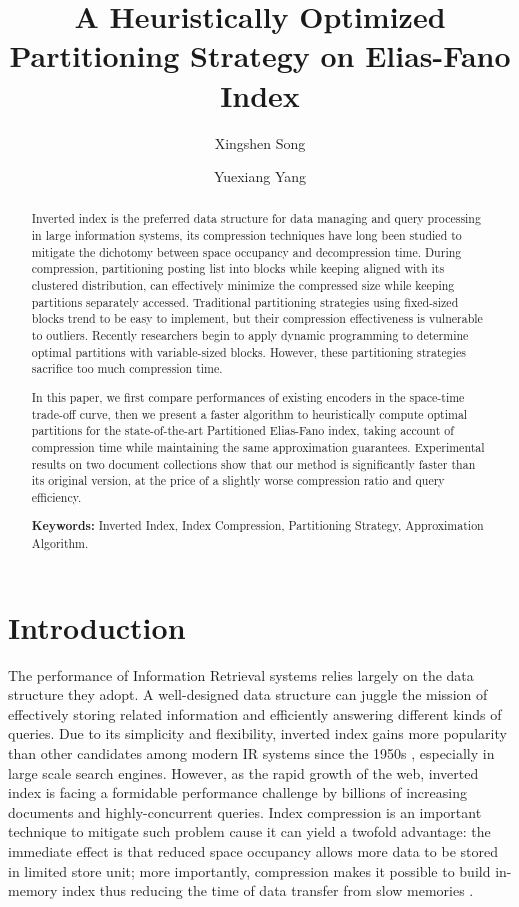\documentclass[runningheads]{comsis2}
\title{A Heuristically Optimized Partitioning Strategy on Elias-Fano Index}
\author{Xingshen Song \and Yuexiang Yang}
\institute{College of Computer, National University of Defense Technology\\ Changsha, China\\
  \email{\{songxingshen, yyx\}@nudt.edu.cn}}
\begin{document}
\maketitle

\begin{abstract}
Inverted index is the preferred data structure for data managing and query processing in large information systems, its compression techniques have long been studied to mitigate the dichotomy between space occupancy and decompression time.
During compression, partitioning posting list into blocks while keeping aligned with its clustered distribution, can effectively minimize the compressed size while keeping partitions separately accessed.
Traditional partitioning strategies using fixed-sized blocks trend to be easy to implement, but their compression effectiveness is vulnerable to outliers.
Recently researchers begin to apply dynamic programming to determine optimal partitions with variable-sized blocks.
However, these partitioning strategies sacrifice too much compression time.

In this paper, we first compare performances of existing encoders in the space-time trade-off curve, then we present a faster algorithm to heuristically compute optimal partitions for the state-of-the-art Partitioned Elias-Fano index, taking account of compression time while maintaining the same approximation guarantees.
Experimental results on two document collections show that our method is significantly faster than its original version, at the price of a slightly worse compression ratio and query efficiency.

\vspace{6pt}\textbf{Keywords:} Inverted Index, Index Compression, Partitioning Strategy, Approximation Algorithm.
\end{abstract}

\section{Introduction}\label{sec:intro}

The performance of Information Retrieval systems relies largely on the data structure they adopt.
A well-designed data structure can juggle the mission of effectively storing related information and efficiently answering different kinds of queries.
Due to its simplicity and flexibility, inverted index gains more popularity than other candidates among modern IR systems since the 1950s \cite{buttcher2010information,witten1999managing}, especially in large scale search engines.
However, as the rapid growth of the web, inverted index is facing a formidable performance challenge by billions of increasing documents and highly-concurrent queries.
Index compression is an important technique to mitigate such problem cause it can yield a twofold advantage:
the immediate effect is that reduced space occupancy allows more data to be stored in limited store unit;
more importantly, compression makes it possible to build in-memory index thus reducing the time of data transfer from slow memories \cite{manning2008introduction,zobel2006inverted}.
\end{document}
